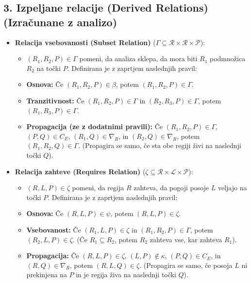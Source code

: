 \documentclass{article}
\begin{document}
\subsection*{3. Izpeljane relacije (Derived Relations) (Izračunane z analizo)}

\begin{itemize}
	\item \textbf{Relacija vsebovanosti (Subset Relation)} ($\Gamma \subseteq \mathcal{R} \times \mathcal{R} \times \mathcal{P}$):
	      \begin{itemize}
		      \item $(R_1, R_2, P) \in \Gamma$ pomeni, da analiza sklepa, da mora biti $R_1$ podmnožica $R_2$ na točki $P$. Definirana je z zaprtjem naslednjih pravil:
		      \item \textbf{Osnova:} Če $(R_1, R_2, P) \in \beta$, potem $(R_1, R_2, P) \in \Gamma$.
		      \item \textbf{Tranzitivnost:} Če $(R_1, R_2, P) \in \Gamma$ in $(R_2, R_3, P) \in \Gamma$, potem $(R_1, R_3, P) \in \Gamma$.
		      \item \textbf{Propagacija (ze z dodatnimi pravili):} Če $(R_1, R_2, P) \in \Gamma$, $(P, Q) \in C_E$, $(R_1, Q) \in \nabla_R$, in $(R_2, Q) \in \nabla_R$, potem $(R_1, R_2, Q) \in \Gamma$. (Propagira se samo, če sta obe regiji živi na naslednji točki $Q$).
	      \end{itemize}

	\item \textbf{Relacija zahteve (Requires Relation)} ($\zeta \subseteq \mathcal{R} \times \mathcal{L} \times \mathcal{P}$):
	      \begin{itemize}
		      \item $(R, L, P) \in \zeta$ pomeni, da regija $R$ zahteva, da pogoji posoje $L$ veljajo na točki $P$. Definirana je z zaprtjem naslednjih pravil:
		      \item \textbf{Osnova:} Če $(R, L, P) \in \psi$, potem $(R, L, P) \in \zeta$.
		      \item \textbf{Vsebovanost:} Če $(R_1, L, P) \in \zeta$ in $(R_1, R_2, P) \in \Gamma$, potem $(R_2, L, P) \in \zeta$. (Če $R_1 \subseteq R_2$, potem $R_2$ zahteva vse, kar zahteva $R_1$).
		      \item \textbf{Propagacija:} Če $(R, L, P) \in \zeta$, $(L, P) \notin \kappa$, $(P, Q) \in C_E$, in $(R, Q) \in \nabla_R$, potem $(R, L, Q) \in \zeta$. (Propagira se samo, če posoja $L$ ni prekinjena na $P$ in je regija živa na naslednji točki $Q$).
	      \end{itemize}


\end{itemize}
\end{document}
